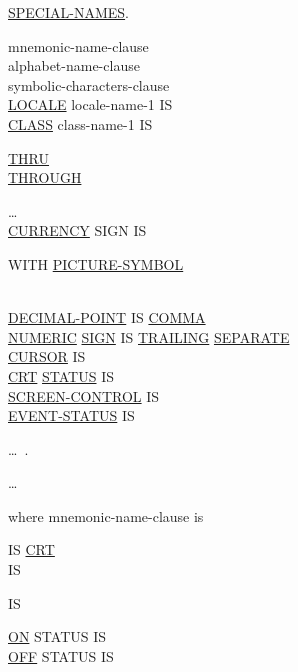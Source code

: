 \documentclass[a4paper,oneside,svgnames]{scrbook}
\makeatletter
\newcommand{\key}[1]{\underline{#1}}
\newcommand{\miscext}[1]{%
  \colorbox{blue!50}{#1}}
\newcommand{\pending}[1]{%
  \textcolor{gray!75}{#1}}
\newenvironment{0-1}{$\left[ \begin{tabular}{@{}l@{}}}{\end{tabular} \right]$}
\newenvironment{1=}{$\left\{ \begin{tabular}{@{}l@{}}}{\end{tabular} \right\}$}
\newenvironment{1+}{$\left\{\left| \begin{tabular}{@{}l@{}}}{\end{tabular} \right|\right\}$}
\makeatother
\begin{document}
\begin{0-1}
  \key{SPECIAL-NAMES}.
\end{0-1}

\begin{0-1}
  \begin{1=}
    mnemonic-name-clause \\
    alphabet-name-clause \\
    symbolic-characters-clause \\
    \key{LOCALE} locale-name-1 IS \literal \\

    \key{CLASS} class-name-1 IS
    \begin{1=}
      \literal
      \begin{0-1}
        \begin{1=}
          \key{THRU} \\
          \key{THROUGH}
        \end{1=}
        \literal
      \end{0-1}
    \end{1=}\ldots \\

    \key{CURRENCY} SIGN IS \literal
    \begin{0-1}
      \pending{WITH \key{PICTURE-SYMBOL} \literal}
    \end{0-1} \\

    \key{DECIMAL-POINT} IS \key{COMMA} \\
    \miscext{\key{NUMERIC} \key{SIGN} IS \key{TRAILING} \key{SEPARATE}} \\
    \key{CURSOR} IS \identifier \\
    \key{CRT} \key{STATUS} IS \identifier \\
    \miscext{\pending{\key{SCREEN-CONTROL} IS \identifier}} \\
    \miscext{\pending{\key{EVENT-STATUS} IS \identifier}}
  \end{1=}\ldots\ {}.
\end{0-1}\ldots

where mnemonic-name-clause is

\mnemonicname
\begin{1=}
  IS \key{CRT} \\
  \integer IS \systemname \\
  \begin{0-1}
    IS \switchname
  \end{0-1}
  \begin{1+}
      \key{ON} STATUS IS \switchstatusname \\
      \key{OFF} STATUS IS \switchstatusname
  \end{1+}
\end{1=}
\end{document}
